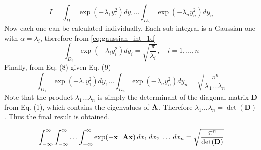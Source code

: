 \documentclass[a4paper]{article}
\begin{document}
\[
	I = \int_{D_1} \exp(-\lambda_1 y_1^2)dy_1 \ldots  \int_{D_n} \exp(-\lambda_n y_n^2)dy_n
	\tag{8}
\]
Now each one can be calculated individually. Each sub-integral is a Gaussian one with $\alpha = \lambda_i$, therefore from \eqref{eq:gaussian_int_1d}
\[
	\int_{D_i} \exp(-\lambda_i y_i^2)dy_i = \sqrt{\frac{\pi}{\lambda_i}}, \quad i=1,\ldots,n
	\tag{9}
\]
Finally, from Eq. (8) given Eq. (9)
\[
	\int_{D_1} \exp(-\lambda_1 y_1^2)dy_1 \ldots  \int_{D_n} \exp(-\lambda_n y_n^2)dy_n = \sqrt{ \frac{\pi^n}{\lambda_1\ldots \lambda_n} }
	\tag{10}
\]
Note that the product $\lambda_1\ldots \lambda_n$ is simply the determinant of the diagonal matrix $\textbf{D}$ from Eq. (1), which contains the eigenvalues of $\textbf{A}$. Therefore $\lambda_1\ldots \lambda_n = \det(\textbf{D})$. Thus the final result is obtained.
\begin{corollary}
	\begin{equation}
	\int_{-\infty}^\infty \int_{-\infty}^\infty \ldots \int_{-\infty}^\infty \exp(-\textbf{x}^{\top} \textbf{A} \textbf{x}) \,dx_1\,dx_2\,\ldots\, dx_n = 
		\sqrt{ \frac{\pi^n}{\det(\textbf{D})} }
	\end{equation}
\end{corollary}
\end{document}
